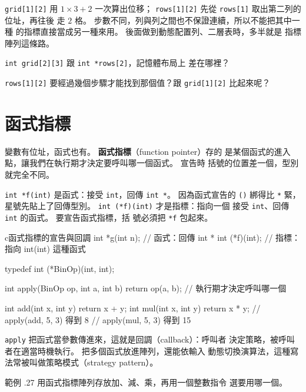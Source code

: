 \texttt{grid[1][2]} 用 $1 \times 3 + 2$ 一次算出位移；
\texttt{rows[1][2]} 先從 \texttt{rows[1]} 取出第二列的位址，再往後
走 $2$ 格。 步數不同，列與列之間也不保證連續，所以不能把其中一種
的指標直接當成另一種來用。 後面做到動態配置列、二層表時，多半就是
指標陣列這條路。


\begin{drills}[label=drills:ptr-array-of-pointers]
\item \texttt{int grid[2][3]} 跟 \texttt{int *rows[2]}，記憶體布局上
差在哪裡？
\item \texttt{rows[1][2]} 要經過幾個步驟才能找到那個值？跟
\texttt{grid[1][2]} 比起來呢？
\end{drills}

\section{函式指標}
\label{sec:ptr-funcptr}

變數有位址，函式也有。 \textbf{函式指標}（function pointer）存的
是某個函式的進入點，讓我們在執行期才決定要呼叫哪一個函式。 宣告時
括號的位置差一個，型別就完全不同。

\texttt{int *f(int)} 是函式：接受 \texttt{int}，回傳
\texttt{int *}。 因為函式宣告的 \texttt{()} 綁得比 \texttt{*} 緊，
星號先貼上了回傳型別。 \texttt{int (*f)(int)} 才是指標：指向一個
接受 \texttt{int}、回傳 \texttt{int} 的函式。 要宣告函式指標，括
號必須把 \texttt{*f} 包起來。

\begin{code}{c}{函式指標的宣告與回調}
int *g(int n);            // 函式：回傳 int *
int (*f)(int);            // 指標：指向  int(int) 這種函式

typedef int (*BinOp)(int, int);

int apply(BinOp op, int a, int b) {
    return op(a, b);      // 執行期才決定呼叫哪一個
}

int add(int x, int y) { return x + y; }
int mul(int x, int y) { return x * y; }
// apply(add, 5, 3) 得到 8
// apply(mul, 5, 3) 得到 15
\end{code}

\texttt{apply} 把函式當參數傳進來，這就是回調（callback）：呼叫者
決定策略，被呼叫者在適當時機執行。 把多個函式放進陣列，還能依輸入
動態切換演算法，這種寫法常被叫做策略模式（strategy pattern）。

範例 \thechapter.27 用函式指標陣列存放加、減、乘，再用一個整數指令
選要用哪一個。

